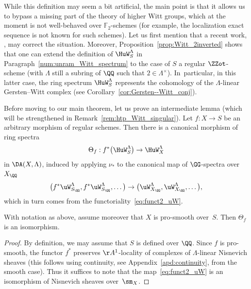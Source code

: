 \begin{rem}\label{rem:justif_df_uW}
While this definition may seem a bit artificial, the main point is that it allows us to bypass a missing part of the theory of higher Witt groups,
which at the moment is not well-behaved over $\mathbb F_2$-schemes
(for example, the localization exact sequence is not known for such schemes).
Let us first mention that a recent work, \cite{realK1,realK2,realK3}, may correct the situation.
Moreover, Proposition~\ref{prop:Witt_2inverted} shows that
one can extend the definition of $\HuW_S^\Lambda$ in Paragraph~\ref{num:unram_Witt_spectrum}
to the case of $S$ a regular $\ZZot$-scheme (with $\Lambda$ still a subring of $\QQ$ such that $2 \in \Lambda^\times$).
In~particular, in this latter case, the ring spectrum $\HuW_S^\Lambda$
represents the cohomology of the $\Lambda$-linear Gersten--Witt complex
(see Corollary~\ref{cor:Gersten--Witt_conj}).
\end{rem}

\begin{num}
Before moving to our main theorem, let us prove an intermediate lemma
(which will be strengthened in Remark~\ref{rem:htp_Witt_singular}).
Let $f:X \to S$ be an arbitrary morphism of regular schemes.
Then there is a canonical morphism of ring spectra
\[
\Theta_f:f^*\big(\HuW^\Lambda_S\big) \to \HuW^\Lambda_X
\]
in $\DA(X,\Lambda)$, induced by applying $\nu_*$ to the canonical map of $\GG$-spectra over $X_\QQ$
\[
\big(f^*\uW^\Lambda_{S_\QQ},f^*\uW^\Lambda_{S_\QQ},\hdots\big)
\to \big(\uW^\Lambda_{X_\QQ},\uW^\Lambda_{X_\QQ},\hdots\big),
\]
which in turn comes from the functoriality~\eqref{eq:funct2_uW}.
\end{num}
\begin{lm}\label{lm:W commutes with p^*}
With notation as above, assume moreover that $X$ is pro-smooth over~$S$.
Then $\Theta_f$ is an isomorphism.
\end{lm}
\begin{proof}
By definition, we may assume that $S$ is defined over $\QQ$.
Since $f$ is pro-smooth, the functor $f^*$ preserves $\AA^1$-locality of complexes of $\Lambda$-linear Nisnevich sheaves (this follows using continuity, see Appendix~\ref{apd:continuity}, from the smooth case).
Thus it suffices to note that the map~\eqref{eq:funct2_uW} is an isomorphism
of Nisnevich sheaves over~$\sm_X$.
\end{proof}

